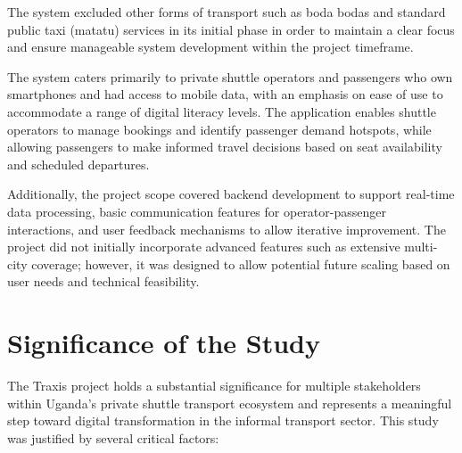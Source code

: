 The system excluded other forms of transport such as boda bodas and standard
public taxi (matatu) services in its initial phase in order to maintain a clear
focus and ensure manageable system development within the project timeframe.


The system caters primarily to private shuttle operators and passengers who own
smartphones and had access to mobile data, with an emphasis on ease of use to
accommodate a range of digital literacy levels. The application enables shuttle
operators to manage bookings and identify passenger demand hotspots, while
allowing passengers to make informed travel decisions based on seat availability
and scheduled departures.


Additionally, the project scope covered backend development to support real-time
data processing, basic communication features for operator-passenger
interactions, and user feedback mechanisms to allow iterative improvement. The
project did not initially incorporate advanced features such as extensive multi-
city coverage; however, it was designed to allow potential future scaling based
on user needs and technical feasibility.


\section{Significance of the Study }
The Traxis project holds a substantial significance for multiple stakeholders
within Uganda’s private shuttle transport ecosystem and represents a meaningful
step toward digital transformation in the informal transport sector. This study
was justified by several critical factors:


